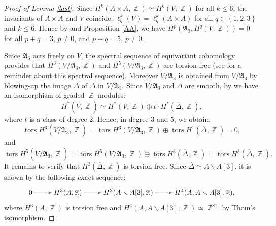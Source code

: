 \documentclass[a4paper]{article}
\theoremstyle{remark}
\DeclareMathOperator{\Z}{\mathbb{Z}}
\DeclareMathOperator{\tors}{tors}
\begin{document}
\begin{proof}[Proof of Lemma \ref{last}]
Since $H^k(A\times A,\Z)\simeq H^k(V,\Z)$ for all $k\leq 6$, the invariants of $A\times A$ and $V$ coincide:
 $\ell_q^k(V)=\ell_q^k(A\times A)$ for all $q\in \left\{1,2,3\right\}$ and $k\leq 6$. 
Hence by \cite[Corollary 4.2]{Lol} and Proposition \ref{AA}, we have $H^{p}(\mathfrak{A}_3,H^q(V,\Z))=0$ for all $p+q=3$, $p\neq 0$, and $p+q=5$, $p\neq 0$.

Since $\mathfrak{A}_3$ acts freely on $V$, the spectral sequence of equivariant cohomology provides that $H^3(V/\mathfrak{A}_3,\Z)$ and $H^5(V/\mathfrak{A}_3,\Z)$ are torsion free (see \cite[Section 4]{Lol} for a reminder about this spectral sequence). 
Moreover $\widetilde{V}/\mathfrak{A}_3$ is obtained from $V/\mathfrak{A}_3$ by blowing-up the image $\overline{\Delta}$ of $\Delta$ in $V/\mathfrak{A}_3$. 
Since $V/\mathfrak{A}_3$ and $\overline{\Delta}$ are smooth, by  \cite[Theorem 4.1]{Li} we have an isomorphism of graded $\Z$-modules:
$$H^*(\widetilde{V},\Z)\simeq H^*(V,\Z)\oplus t\cdot H^*(\overline{\Delta},\Z),$$
where $t$ is a class of degree 2. Hence, in degree 3 and 5, we obtain:
$$\tors H^3(\widetilde{V}/\mathfrak{A}_3,\Z)=\tors H^3(V/\mathfrak{A}_3,\Z)\oplus \tors H^1(\overline{\Delta},\Z)=0,$$ and 
$$\tors H^5(\widetilde{V}/\mathfrak{A}_3,\Z)=\tors H^5(V/\mathfrak{A}_3,\Z)\oplus \tors H^3(\overline{\Delta},\Z)=\tors H^3(\overline{\Delta},\Z).$$
It remains to verify that $H^3(\overline{\Delta},\Z)$ is torsion free. Since $\overline{\Delta}\simeq A\smallsetminus A[3]$, it is shown by the following exact sequence:
$$\xymatrix{ 0\ar[r] & H^3(A,\Z)\ar[r] & H^{3}(A\smallsetminus A[3],\Z)\ar[r]&H^{4}(A,A\smallsetminus A[3],\Z)
,}$$
where $H^3(A,\Z)$ is torsion free and $H^{4}(A,A\smallsetminus A[3],\Z)\simeq \Z^{81}$ by Thom's isomorphism.
\end{proof}

\end{document}
